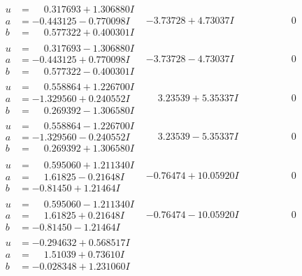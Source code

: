 \documentclass[1p]{elsarticle_modified}
\theoremstyle{definition}
\begin{document}
$$\begin{array}{c|c|c}
\begin{aligned}
u &= \phantom{-}0.317693 + 1.306880 I \\
a &= -0.443125 - 0.770098 I \\
b &= \phantom{-}0.577322 + 0.400301 I\end{aligned}
 & -3.73728 + 4.73037 I & \phantom{-0.000000 } 0 \\ \hline\begin{aligned}
u &= \phantom{-}0.317693 - 1.306880 I \\
a &= -0.443125 + 0.770098 I \\
b &= \phantom{-}0.577322 - 0.400301 I\end{aligned}
 & -3.73728 - 4.73037 I & \phantom{-0.000000 } 0 \\ \hline\begin{aligned}
u &= \phantom{-}0.558864 + 1.226700 I \\
a &= -1.329560 + 0.240552 I \\
b &= \phantom{-}0.269392 - 1.306580 I\end{aligned}
 & \phantom{-}3.23539 + 5.35337 I & \phantom{-0.000000 } 0 \\ \hline\begin{aligned}
u &= \phantom{-}0.558864 - 1.226700 I \\
a &= -1.329560 - 0.240552 I \\
b &= \phantom{-}0.269392 + 1.306580 I\end{aligned}
 & \phantom{-}3.23539 - 5.35337 I & \phantom{-0.000000 } 0 \\ \hline\begin{aligned}
u &= \phantom{-}0.595060 + 1.211340 I \\
a &= \phantom{-}1.61825 - 0.21648 I \\
b &= -0.81450 + 1.21464 I\end{aligned}
 & -0.76474 + 10.05920 I & \phantom{-0.000000 } 0 \\ \hline\begin{aligned}
u &= \phantom{-}0.595060 - 1.211340 I \\
a &= \phantom{-}1.61825 + 0.21648 I \\
b &= -0.81450 - 1.21464 I\end{aligned}
 & -0.76474 - 10.05920 I & \phantom{-0.000000 } 0 \\ \hline\begin{aligned}
u &= -0.294632 + 0.568517 I \\
a &= \phantom{-}1.51039 + 0.73610 I \\
b &= -0.028348 + 1.231060 I\end{aligned}

\end{array}$$
\end{document}
